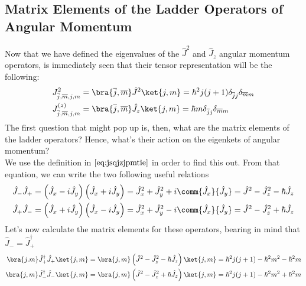 \documentclass[a4paper, 11pt]{book}
\newcommand{\1}{\opr{\mathds{1}}}
\newcommand{\opr}[1]{\hat{#1}}
\newcommand{\adj}[2][]{#2^{\dagger#1}}
\newcommand{\kd}[1]{\delta_{#1}}
\newcommand{\ladopru}[1]{\opr{#1}_{+}}
\newcommand{\ladoprd}[1]{\opr{#1}_{-}}
\theoremstyle{plain}
\begin{document}
	\subsection{Matrix Elements of the Ladder Operators of Angular Momentum}
	Now that we have defined the eigenvalues of the $\opr{J}^2$ and $\opr{J}_z$ angular momentum operators, is immediately seen that their tensor representation will be the following:
	\begin{equation}
		\begin{aligned}
			J^2_{\overline{j},\overline{m},j,m}&=\bra{\overline{j},\overline{m}}\opr{J}^2\ket{j,m}=\hbar^2j(j+1)\kd{\overline{j}j}\kd{\overline{m}m}\\
			J^{(z)}_{\overline{j},\overline{m},j,m}&=\bra{\overline{j},\overline{m}}\opr{J}_z\ket{j,m}=\hbar m\kd{\overline{j}j}\kd{\overline{m}m}
		\end{aligned}
		\label{eq:matrixelementsangmomop}
	\end{equation}
	The first question that might pop up is, then, what are the matrix elements of the ladder operators? Hence, what's their action on the eigenkets of angular momentum?\\
	We use the definition in $\eqref{eq:jsqjzjpmtie}$ in order to find this out. From that equation, we can write the two following useful relations
	\begin{equation}%
		\begin{aligned}
			\ladoprd{J}\ladopru{J}&=\left( \opr{J}_x-i\opr{J}_y \right)\left( \opr{J}_x+i\opr{J}_y \right)=\opr{J}_x^2+\opr{J}_y^2+i\comm{\opr{J}_x}{\opr{J}_y}=\opr{J}^2-\opr{J}_z^2-\hbar\opr{J}_z\\
			\ladopru{J}\ladoprd{J}&=\left( \opr{J}_x+i\opr{J}_y \right)\left( \opr{J}_x-i\opr{J}_y \right)=\opr{J}_x^2+\opr{J}_y^2-i\comm{\opr{J}_x}{\opr{J}_y}=\opr{J}^2-\opr{J}_z^2+\hbar\opr{J}_z
		\end{aligned}
		\label{eq:ladoprudprod}
	\end{equation}
	Let's now calculate the matrix elements for these operators, bearing in mind that $\ladoprd{J}=\adj{\opr{J}}_+$
	\begin{equation}
		\begin{aligned}
			\bra{j.m}\adj{\opr{J}}_+\ladopru{J}\ket{j,m}&=\bra{j,m}\left( \opr{J}^2-\opr{J}^2_z-\hbar\opr{J}_z \right)\ket{j,m}=\hbar^2j(j+1)-\hbar^2m^2-\hbar^2m\\
			\bra{j,m}\adj{\opr{J}}_-\ladoprd{J}\ket{j,m}&=\bra{j,m}\left( \opr{J}^2-\opr{J}^2_z+\hbar\opr{J}_z \right)\ket{j,m}=\hbar^2j(j+1)-\hbar^2m^2+\hbar^2m
		\end{aligned}
		\label{eq:matrixelements}
	\end{equation}
\end{document}
